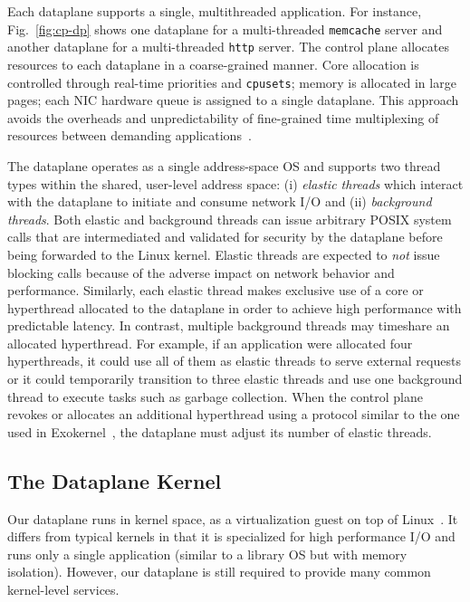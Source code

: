 Each \ix dataplane supports a single, multithreaded application. For
instance, Fig.~\ref{fig:cp-dp} shows one dataplane for a
multi-threaded \texttt{memcache} server and another dataplane for a
multi-threaded \texttt{http} server. The control plane allocates
resources to each dataplane in a coarse-grained manner. Core
allocation is controlled through real-time priorities and
\texttt{cpusets}; memory is allocated in large pages; each NIC
hardware queue is assigned to a single dataplane. This approach avoids
the overheads and unpredictability of fine-grained time multiplexing
of resources between demanding
applications~\cite{DBLP:conf/eurosys/LeverichK14}.

The \ix dataplane operates as a single address-space OS and supports
two thread types within the shared, user-level address space: (i)
\emph{elastic threads} which interact with the \ix dataplane to
initiate and consume network I/O and (ii) \emph{background threads}.
Both elastic and background threads can issue arbitrary POSIX system
calls that are intermediated and validated for security by the
dataplane before being forwarded to the Linux kernel.  Elastic threads
are expected to \emph{not} issue blocking calls because of the adverse
impact on network behavior and performance. Similarly, each elastic
thread makes exclusive use of a core or hyperthread allocated to the
dataplane in order to achieve high performance with predictable
latency. In contrast, multiple background threads may timeshare an
allocated hyperthread. For example, if an application were allocated
four hyperthreads, it could use all of them as elastic threads to
serve external requests or it could temporarily transition to three
elastic threads and use one background thread to execute tasks such as
garbage collection. When the control plane revokes or allocates an
additional hyperthread using a protocol similar to the one used in
Exokernel~\cite{DBLP:conf/sosp/EnglerKO95}, the dataplane must adjust
its number of elastic threads.


\subsection{The Dataplane Kernel}
\label{sec:impl:dpkernel}

Our dataplane runs in kernel space, as a virtualization guest on
top of Linux~\cite{dune}. It differs from typical kernels
in that it is specialized for high performance I/O and runs only
a single application (similar to a library OS but with memory
isolation). However, our dataplane is still required to provide
many common kernel-level services.

